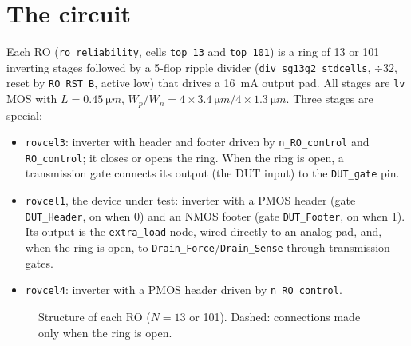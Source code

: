 \documentclass[10pt,a4paper]{article}
\begin{document}
\section{The circuit}
Each RO (\texttt{ro\_reliability}, cells \texttt{top\_13} and \texttt{top\_101}) is a ring of 13 or 101
inverting stages followed by a 5-flop ripple divider (\texttt{div\_sg13g2\_stdcells}, $\div 32$, reset by
\texttt{RO\_RST\_B}, active low) that drives a \SI{16}{mA} output pad. All stages are \texttt{lv} MOS with
$L = \SI{0.45}{\micro m}$, $W_p/W_n = 4 \times \SI{3.4}{\micro m} / 4 \times \SI{1.3}{\micro m}$. Three
stages are special:
\begin{itemize}
  \item \texttt{rovcel3}: inverter with header and footer driven by \texttt{n\_RO\_control} and
        \texttt{RO\_control}; it closes or opens the ring. When the ring is open, a transmission gate
        connects its output (the DUT input) to the \texttt{DUT\_gate} pin.
  \item \texttt{rovcel1}, the device under test: inverter with a PMOS header (gate \texttt{DUT\_Header},
        on when 0) and an NMOS footer (gate \texttt{DUT\_Footer}, on when 1). Its output is the
        \texttt{extra\_load} node, wired directly to an analog pad, and, when the ring is open, to
        \texttt{Drain\_Force}/\texttt{Drain\_Sense} through transmission gates.
  \item \texttt{rovcel4}: inverter with a PMOS header driven by \texttt{n\_RO\_control}.
\end{itemize}

\begin{figure}[H]\centering
{}
\caption{Structure of each RO ($N = 13$ or 101). Dashed: connections made only when the ring is open.}
\end{figure}
\end{document}
